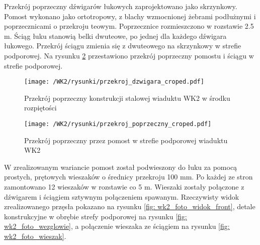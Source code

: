  Przekrój poprzeczny dźwigarów łukowych zaprojektowano jako skrzynkowy. Pomost wykonano jako ortotropowy, z blachy wzmocnionej żebrami podłużnymi i poprzecznicami o przekroju teowym. Poprzecznice rozmieszczono w rozstawie 2.5 m. Ściąg łuku stanowią belki dwuteowe, po jednej dla każdego dźwigara łukowego. Przekrój ściągu zmienia się z dwuteowego na skrzynkowy w strefie podporowej. Na rysunku \ref{fig: wk2_cross_sect_deck} przestawiono przekrój poprzeczny pomostu i ściągu w strefie podporowej. 
  \begin{figure}[hbt!]
 	\centering
 	\texttt{[image: /WK2/rysunki/przekroj\_dzwigara\_croped.pdf]}
 	\captionsetup{justification=centering}
 	\caption{Przekrój poprzeczny konstrukcji stalowej wiaduktu WK2 w środku rozpiętości}
 	\label{fig: wk2_cross_sect}
 \end{figure}
 \begin{figure}[h]
 	\centering
 	\texttt{[image: /WK2/rysunki/przekroj\_poprzeczny\_croped.pdf]}
 	\captionsetup{justification=centering}
 	\caption{Przekrój poprzeczny przez pomost w strefie podporowej wiaduktu WK2}
 	\label{fig: wk2_cross_sect_deck}
 \end{figure}
 
 W zrealizowanym wariancie pomost został podwieszony do łuku za pomocą prostych, prętowych wieszaków o średnicy przekroju 100 mm. Po każdej ze stron zamontowano 12 wieszaków w rozstawie co 5 m. Wieszaki zostały połączone z dźwigarem i ściągiem sztywnym połączeniem spawanym. Rzeczywisty widok zrealizowanego przęsła pokazano na rysunku \ref{fig: wk2_foto_widok_front}, detale konstrukcyjne w obrębie strefy podporowej na rysunku \ref{fig:  wk2_foto_wezglowie}, a połączenie wieszaka ze ściągiem na rysunku \ref{fig: wk2_foto_wieszak}.


